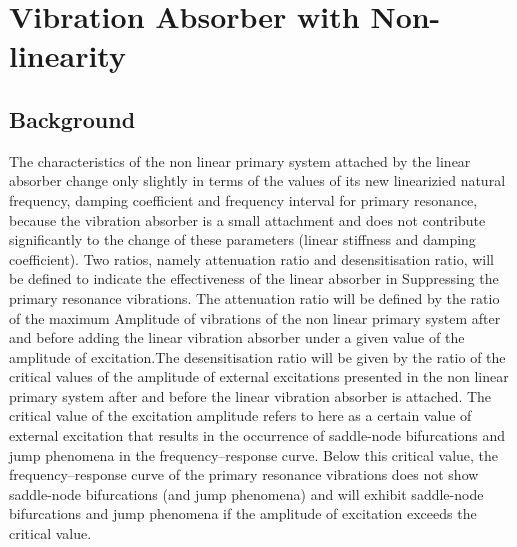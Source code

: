 %
\chapter{Vibration Absorber with Non-linearity}
\section{Background}
The characteristics of the non linear primary system attached by the linear absorber change only slightly in terms of the values of its new linearizied natural frequency, damping coefficient and frequency interval for primary resonance, because the vibration absorber is a small attachment and does not contribute significantly to the change of these parameters (linear stiffness and damping coefficient). Two ratios, namely attenuation ratio and desensitisation ratio, will be defined to indicate the effectiveness of the linear absorber in Suppressing the primary resonance vibrations. The attenuation ratio will be defined by the ratio of the maximum Amplitude of vibrations of the non linear primary system after and before adding the linear vibration absorber under a given value of the amplitude of excitation.The desensitisation ratio will be given by the ratio of the critical values of the amplitude of external excitations presented in the non linear primary system after and before the linear vibration absorber is attached. The critical value of the excitation amplitude refers to here as a certain value of external excitation that results in the occurrence of saddle-node bifurcations and jump phenomena in the frequency–response curve. Below this critical value, the frequency–response curve of the primary resonance vibrations does not show saddle-node bifurcations (and jump phenomena) and will exhibit saddle-node bifurcations and jump phenomena if the amplitude of excitation exceeds the critical value.


